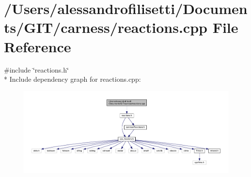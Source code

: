 \hypertarget{a00075}{\section{/\+Users/alessandrofilisetti/\+Documents/\+G\+I\+T/carness/reactions.cpp File Reference}
\label{a00075}
}
{\ttfamily \#include \char`\"{}reactions.\+h\char`\"{}}\\*
Include dependency graph for reactions.\+cpp\+:\nopagebreak
\begin{figure}[H]
\begin{center}
\leavevmode
\includegraphics[width=350pt]{a00197}
\end{center}
\end{figure}
